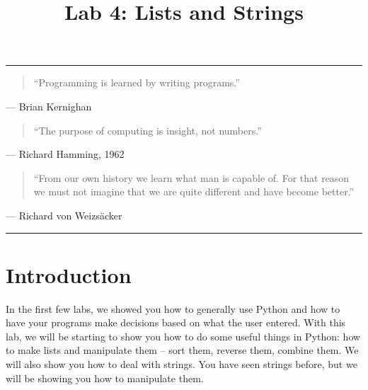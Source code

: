 \documentclass[11pt]{cselabheader}
\title{Lab 4: Lists and Strings}
\begin{document}
\maketitle
{}
\hrule

\begin{quotation}
``Programming is learned by writing programs.''
\end{quotation}
\begin{flushright}
--- Brian Kernighan
\end{flushright}

\begin{quotation}
``The purpose of computing is insight, not numbers.''
\end{quotation}
\begin{flushright}
--- Richard Hamming, 1962
\end{flushright}

\begin{quotation}
  ``From our own history we learn what man is capable of. For that reason we
  must not imagine that we are quite different and have become better.''
\end{quotation}
\begin{flushright}
  --- Richard von Weizs\"{a}cker
\end{flushright}
\hrule

\section*{Introduction}

In the first few labs, we showed you how to generally use Python and how to
have your programs make decisions based on what the user entered. With this
lab, we will be starting to show you how to do some useful things in Python:
how to make lists and manipulate them -- sort them, reverse them, combine them.
We will also show you how to deal with strings. You have seen strings before,
but we will be showing you how to manipulate them.

\pagebreak
\end{document}
